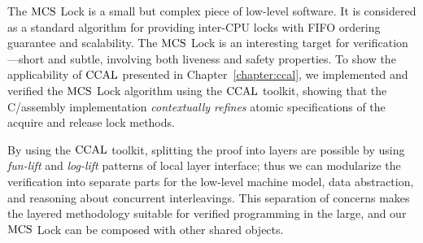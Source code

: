 
The $\mathrm{MCS}$ Lock is a small but complex piece of low-level software.
It is considered as a standard algorithm for providing inter-CPU locks with FIFO ordering guarantee and scalability.
The $\mathrm{MCS}$ Lock is an interesting target for verification---short and subtle, involving both liveness and safety properties. 
To show the applicability of $\mathrm{CCAL}$ presented in Chapter~\ref{chapter:ccal},
we implemented and verified the $\mathrm{MCS}$ Lock algorithm using the $\mathrm{CCAL}$ toolkit, 
showing that the C/assembly implementation {\em contextually refines} atomic specifications of the acquire and release lock methods.

By using the $\mathrm{CCAL}$ toolkit, splitting the proof into layers are possible by using \textit{fun-lift} and \textit{log-lift} patterns of local layer interface;
thus we can modularize the verification into separate parts for the low-level machine model, data abstraction, and reasoning about concurrent interleavings.
This separation of concerns makes the layered methodology suitable for verified programming in the large, and our 
$\mathrm{MCS}$ Lock can be composed with other shared objects.

